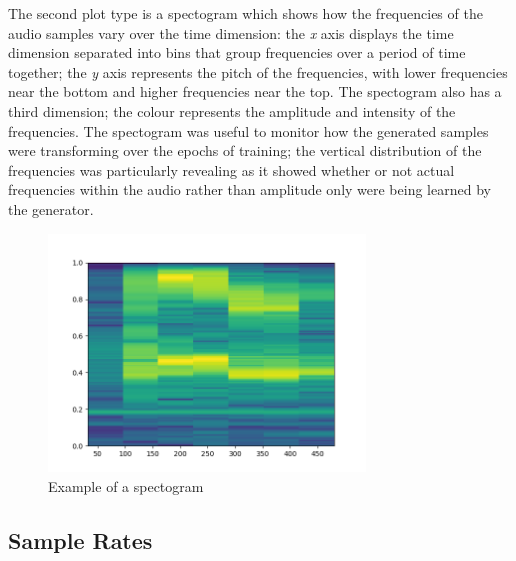 \documentclass[a4paper, titlepage]{article}
\begin{document}
\newline
The second plot type is a spectogram which shows how the frequencies of the audio samples vary over the time dimension: the \textit{x} axis displays the time dimension separated into bins that group frequencies over a period of time together; the \textit{y} axis represents the pitch of the frequencies, with lower frequencies near the bottom and higher frequencies near the top.
The spectogram also has a third dimension; the colour represents the amplitude and intensity of the frequencies.
\newline
\newline
The spectogram was useful to monitor how the generated samples were transforming over the epochs of training; the vertical distribution of the frequencies was particularly revealing as it showed whether or not actual frequencies within the audio rather than amplitude only were being learned by the generator.
\newline
\begin{figure}[ht]
  \caption{Example of a spectogram}
  \centering
  \includegraphics[width=0.75\textwidth]{AudioSpec}
\end{figure}

\subsection{Sample Rates}
\end{document}
